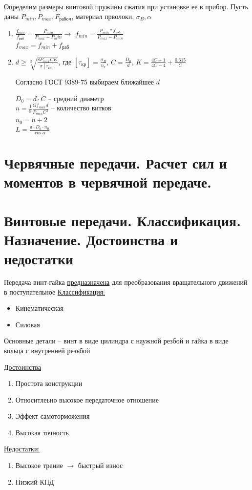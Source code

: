 \documentclass{article}
\begin{document}
Определим размеры винтовой пружины сжатия при установке ее в прибор.
Пусть даны $P_{min}, P_{max}, F_{рабоч}$, материал прволоки, $\sigma_{B}, \alpha$
\begin{enumerate}
	\item $ \frac{f_{min}}{f_{раб}} = \frac{P_{min}}{P_{max} - P_min} \to $
	$f_{min} = \frac{P_{min} * f_{раб}}{P_{max} - P_{min}} $\\
	$f_{max} = f_{min} + f_{раб}$
	\item $d \ge \sqrt[2]{ \frac{8 P_{max} C K}{\pi [\tau_{кр}]} }$, где $[\tau_{кр}] = \frac{\sigma_{B}}{n_т}$,
	$C = \frac{D_0}{d } $,
	$K = \frac{4 C - 1}{4 C - 4} + \frac{0.615}{C} $
	
	Согласно ГОСТ 9389-75 выбираем ближайшее $d$

	$D_0 = d \cdot C$ -- средний диаметр\\
	$n = \frac{1}{8} \frac{G f_{max} d }{P_{max} C^3} $ -- количество витков\\
	$n_0 = n + 2$\\
	$L = \frac{\pi \cdot D_0 \cdot n_0}{\cos{ \alpha}} $
\end{enumerate}
\section {Червячные передачи. Расчет сил и моментов в червячной передаче.}



\section {Винтовые передачи. Классификация. Назначение. Достоинства и недостатки}

Передача винт-гайка \underline{предназначена} для преобразования вращательного движений в поступательное
\underline{Классификация:}
\begin{itemize}
	\item Кинематическая
	\item Силовая
\end{itemize}

Основные детали -- винт в виде цилиндра с наужной резбой и гайка в виде кольца с внутренней резьбой

\underline{Достоинства}
\begin{enumerate}
	\item Простота конструкции
	\item Относитлеьно высокое передаточное отношение
	\item Эффект самоторможения
	\item Высокая точность
\end{enumerate}
\underline{Недостатки:} 
\begin{enumerate}
	\item Высокое трение $\to$ быстрый износ
	\item Низкий КПД
\end{enumerate}
\end{document}
